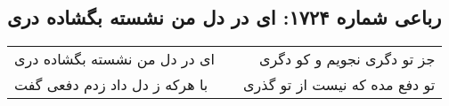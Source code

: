 \begin{center}
\section*{رباعی شماره ۱۷۲۴: ای در دل من نشسته بگشاده دری}
\label{sec:1724}
\begin{longtable}{l p{0.5cm} r}
ای در دل من نشسته بگشاده دری
&&
جز تو دگری نجویم و کو دگری
\\
با هرکه ز دل داد زدم دفعی گفت
&&
تو دفع مده که نیست از تو گذری
\\
\end{longtable}
\end{center}
